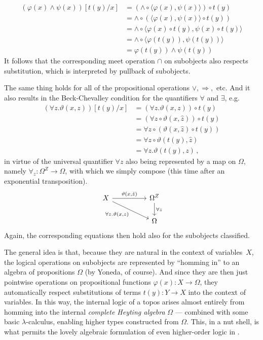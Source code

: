 \documentclass[12pt,reqno]{amsart}
\renewcommand{\to}{\ensuremath{\rightarrow}}
\theoremstyle{remark}
\theoremstyle{definition}
\begin{document}
\begin{align*}
(\varphi(x)\wedge\psi(x))[t(y)/x] &= (\wedge \circ \langle \varphi(x), \psi(x) \rangle) \circ t(y)\\
&= \wedge \circ (\langle \varphi(x), \psi(x) \rangle \circ t(y))\\
&= \wedge \circ \langle \varphi(x)\circ t(y), \psi(x)\circ t(y) \rangle\\
&=  \wedge \circ  \langle \varphi(t(y)), \psi(t(y))\rangle \\
&=  \varphi(t(y))\wedge\psi(t(y)) 
\end{align*}
It follows that the corresponding meet operation $\cap$ on subobjects also respects substitution, which is interpreted by pullback of subobjects.

The same thing holds for all of the propositional operations $\vee, \Rightarrow,$ etc.  And it also results in the Beck-Chevalley condition for the quantifiers $\forall$ and $\exists$, e.g.\
\begin{align*}
(\forall z .\vartheta(x,z))[t(y)/x] &= (\forall z .\vartheta(x,z))\circ t(y) \\
&= (\forall z \circ \vartheta(x,\hat{z}))\circ t(y)\\
&= \forall z \circ (\vartheta(x,\hat{z})\circ t(y))\\
&= \forall z \circ \vartheta(t(y),\hat{z})\\
&= \forall z .\vartheta(t(y),z)\,,
\end{align*}
in virtue of the universal quantifier $\forall z$ also being represented by a map on $\Omega$, namely $\forall_z : \Omega^{Z} \to \Omega$, with which we simply compose (this time after an exponential transposition).
\begin{equation}\label{diag:BCforQ}
\begin{tikzcd}
 X \ar[rr, "{\vartheta(x,\hat{z})}" ] \ar[rrd,swap,  "{\forall z. \vartheta(x,z)}"] && \Omega^{Z} \ar[d, "{\forall z}"] \\
 && \Omega
\end{tikzcd}
\end{equation}
Again, the corresponding equations then hold also for the subobjects classified.

The general idea is that, because they are natural in the context of variables~$X$, the logical operations on subobjects are represented by ``homming in'' to an algebra of propositions $\Omega$ (by Yoneda, of course). And since they are then just pointwise operations on propositional functions $\varphi(x) : X \to \Omega$, they automatically respect substitutions of terms $t(y): Y \to X$  into the context of variables.  In this way,  the internal logic of a topos arises almost entirely from homming into the internal \emph{complete Heyting algebra} $\Omega$ --- combined with some basic $\lambda$-calculus, enabling higher types constructed from $\Omega$.  This, in a nut shell, is what permits the lovely algebraic formulation of even higher-order logic in \cite{LS:1988}.  
\end{document}
